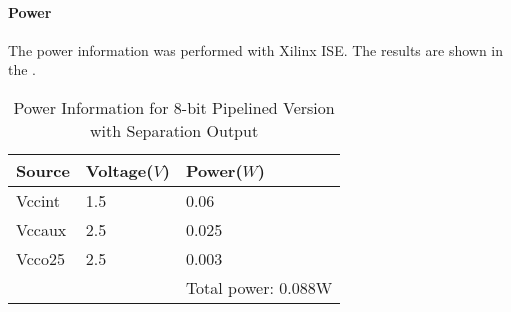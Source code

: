 \paragraph{Power}
The power information was performed with Xilinx ISE. The results are shown in the .

\begin{table}[!ht]
	\renewcommand{\arraystretch}{1.3}
	\caption{Power Information for 8-bit Pipelined Version with Separation Output}
	\centering
	\begin{tabular}{ p{4cm} p{4cm} p{4cm} }
		\hline
		\bfseries Source & \bfseries Voltage(\(V\)) & \bfseries Power(\(W\)) \\
		\hline
		Vccint           & 1.5                      & 0.06                   \\
		Vccaux           & 2.5                      & 0.025                  \\
		Vcco25           & 2.5                      & 0.003                  \\
		\hline
		                 &                          & Total power: 0.088W    \\
	\end{tabular}
	\label{tb:p_sep_power}
\end{table}
